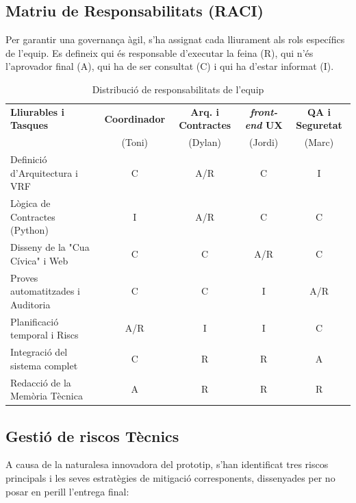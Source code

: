 \newpage
\subsection{Matriu de Responsabilitats (RACI)}

Per garantir una governança àgil, s'ha assignat cada lliurament als rols específics de l'equip. Es defineix qui és responsable d'executar la feina (R), qui n'és l'aprovador final (A), qui ha de ser consultat (C) i qui ha d'estar informat (I).

\begin{table}[H]
\centering
\small
\renewcommand{\arraystretch}{1.3}
\begin{tabularx}{\textwidth}{|X|c|c|c|c|}
\hline
\textbf{Lliurables i Tasques} & \textbf{Coordinador} & \textbf{Arq. i Contractes} & \textbf{\textit{front-end} UX} & \textbf{QA i Seguretat} \\
& (Toni) & (Dylan) & (Jordi) & (Marc) \\ \hline
Definició d'Arquitectura i VRF & C & A/R & C & I \\ \hline
Lògica de Contractes (Python) & I & A/R & C & C \\ \hline
Disseny de la "Cua Cívica" i Web & C & C & A/R & C \\ \hline
Proves automatitzades i Auditoria & C & C & I & A/R \\ \hline
Planificació temporal i Riscs & A/R & I & I & C \\ \hline
Integració del sistema complet & C & R & R & A \\ \hline
Redacció de la Memòria Tècnica & A & R & R & R \\ \hline
\end{tabularx}
\caption{Distribució de responsabilitats de l'equip}
\end{table}

\newpage
\subsection{Gestió de riscos Tècnics}

A causa de la naturalesa innovadora del prototip, s'han identificat tres riscos principals i les seves estratègies de mitigació corresponents, dissenyades per no posar en perill l'entrega final:

